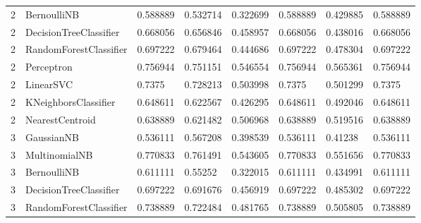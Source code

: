\documentclass{article}
\begin{document}
\begin{table}[h]
\begin{tabular}{llllllll}
2             & BernoulliNB            & 0.588889          & 0.532714          & 0.322699              & 0.588889              & 0.429885                 & 0.588889                 \\
2             & DecisionTreeClassifier & 0.668056          & 0.656846          & 0.458957              & 0.668056              & 0.438016                 & 0.668056                 \\
2             & RandomForestClassifier & 0.697222          & 0.679464          & 0.444686              & 0.697222              & 0.478304                 & 0.697222                 \\
2             & Perceptron             & 0.756944          & 0.751151          & 0.546554              & 0.756944              & 0.565361                 & 0.756944                 \\
2             & LinearSVC              & 0.7375            & 0.728213          & 0.503998              & 0.7375                & 0.501299                 & 0.7375                   \\
2             & KNeighborsClassifier   & 0.648611          & 0.622567          & 0.426295              & 0.648611              & 0.492046                 & 0.648611                 \\
2             & NearestCentroid        & 0.638889          & 0.621482          & 0.506968              & 0.638889              & 0.519516                 & 0.638889                 \\
3             & GaussianNB             & 0.536111          & 0.567208          & 0.398539              & 0.536111              & 0.41238                  & 0.536111                 \\
3             & MultinomialNB          & 0.770833          & 0.761491          & 0.543605              & 0.770833              & 0.551656                 & 0.770833                 \\
3             & BernoulliNB            & 0.611111          & 0.55252           & 0.322015              & 0.611111              & 0.434991                 & 0.611111                 \\
3             & DecisionTreeClassifier & 0.697222          & 0.691676          & 0.456919              & 0.697222              & 0.485302                 & 0.697222                 \\
3             & RandomForestClassifier & 0.738889          & 0.722484          & 0.481765              & 0.738889              & 0.505805                 & 0.738889                 \\

\end{tabular}
\end{table}
\end{document}
